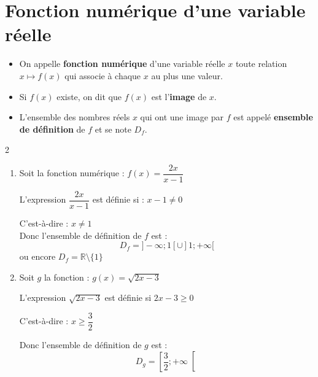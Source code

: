 \newpage

\pagestyle{cours} %







\section{Fonction numérique d'une variable réelle }





\begin{Definition}
\begin{itemize}
    \item On appelle \textbf{fonction numérique} d'une variable réelle $x$ toute relation $x \mapsto f(x)$ qui associe à chaque $x$ au plus une valeur.
    \item Si $f(x)$ existe, on dit que $f(x)$ est l'\textbf{image} de $x$.
    \item L'ensemble des nombres réels $x$ qui ont une image par $f$ est appelé \textbf{ensemble de définition} de $f$ et se note $D_f$.
\end{itemize}
\end{Definition}

\begin{Exemple}[][10 min]
\begin{multicols}{2}
\begin{enumerate}
    \item Soit la fonction numérique : $f(x) = \dfrac{2x}{x-1}$
    
    L'expression $\dfrac{2x}{x-1}$ est définie si : $x - 1 \neq 0$ 
    
    C'est-à-dire : $x \neq 1$ \\
    Donc l'ensemble de définition de $f$ est : $$D_f = ]-\infty ; 1[ \cup ]1 ; +\infty[$$ ou encore $D_f = \mathbb{R} \setminus \{1\}$

\columnbreak
    \item Soit $g$ la fonction : $g(x) = \sqrt{2x - 3}$ 
    
    L'expression $\sqrt{2x - 3}$ est définie si $2x - 3 \geq 0$
    
    C'est-à-dire : $x \geq \dfrac{3}{2}$ 
    
    Donc l'ensemble de définition de $g$ est : $$D_g = \left[\dfrac{3}{2} ; +\infty\right[$$
\end{enumerate}
\end{multicols}
\end{Exemple}

